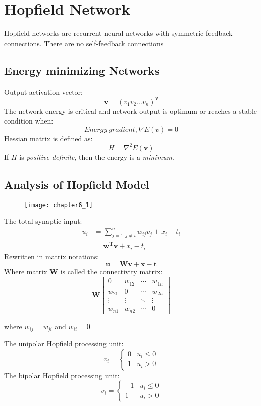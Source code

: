 \chapter{Hopfield Network}
Hopfield networks are recurrent neural networks with symmetric feedback connections. There are no self-feedback connections

\section{Energy minimizing Networks}
Output activation vector:
$$\mathbf{v} = (v_1 v_2 \ldots v_n)^{T}$$
The network energy is critical and network output is optimum or reaches a stable condition when:
$$Energy\ gradient, \nabla E(v) = 0$$
Hessian matrix is defined as:
$$H = \nabla^{2} E(\mathbf{v})$$
If $H$ is \emph{positive-definite}, then the energy is a \emph{minimum}.

\section{Analysis of Hopfield Model}
\begin{figure}[!h]
\centering
\texttt{[image: chapter6\_1]}
\end{figure}
The total synaptic input:
\begin{equation}
\begin{split}
u_i &= \sum_{j=1,j\ne i}^{n} w_{ij} v_j + x_i -t_i \\
&= \mathbf{w^{T} v} + x_i - t_i
\end{split}
\label{hopfield_input}
\end{equation}
Rewritten in matrix notations:
$$\mathbf{u = W v + x - t}$$
Where matrix $\mathbf{W}$ is called the connectivity matrix:
$$ \mathbf{W}
\begin{bmatrix}
0 & w_{12} & \cdots & w_{1n} \\
w_{21} & 0 & \cdots & w_{2n} \\
\vdots & \vdots & \ddots & \vdots \\
w_{n1} & w_{n2} & \cdots & 0
\end{bmatrix}
$$
\begin{center}where $w_{ij} = w_{ji}$ and $w_{ii} = 0$ \end{center}
The unipolar Hopfield processing unit:
$$v_{i} =
\begin{cases} 
    0 & u_i \le 0 \\
    1 & u_i > 0
\end{cases}
$$
The bipolar Hopfield processing unit:
$$v_{i} =
\begin{cases} 
    -1 & u_i \le 0 \\
    1 & u_i > 0
\end{cases}
$$

